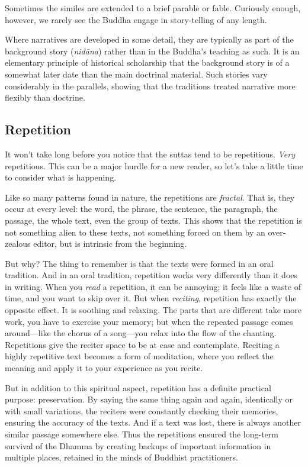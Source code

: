 \documentclass[12pt,openany]{book}%
\begin{document}
Sometimes the similes are extended to a brief parable or fable. Curiously enough, however, we rarely see the Buddha engage in story-telling of any length.

Where narratives are developed in some detail, they are typically as part of the background story (\textit{\textsanskrit{nidāna}}) rather than in the Buddha’s teaching as such. It is an elementary principle of historical scholarship that the background story is of a somewhat later date than the main doctrinal material. Such stories vary considerably in the parallels, showing that the traditions treated narrative more flexibly than doctrine.

\subsection*{Repetition}

It won’t take long before you notice that the suttas tend to be repetitious. \emph{Very} repetitious. This can be a major hurdle for a new reader, so let’s take a little time to consider what is happening.

Like so many patterns found in nature, the repetitions are \emph{fractal}. That is, they occur at every level: the word, the phrase, the sentence, the paragraph, the passage, the whole text, even the group of texts. This shows that the repetition is not something alien to these texts, not something forced on them by an over-zealous editor, but is intrinsic from the beginning.

But why? The thing to remember is that the texts were formed in an oral tradition. And in an oral tradition, repetition works very differently than it does in writing. When you \emph{read} a repetition, it can be annoying; it feels like a waste of time, and you want to skip over it. But when \emph{reciting}, repetition has exactly the opposite effect. It is soothing and relaxing. The parts that are different take more work, you have to exercise your memory; but when the repeated passage comes around—like the chorus of a song—you relax into the flow of the chanting. Repetitions give the reciter space to be at ease and contemplate. Reciting a highly repetitive text becomes a form of meditation, where you reflect the meaning and apply it to your experience as you recite.

But in addition to this spiritual aspect, repetition has a definite practical purpose: preservation. By saying the same thing again and again, identically or with small variations, the reciters were constantly checking their memories, ensuring the accuracy of the texts. And if a text was lost, there is always another similar passage somewhere else. Thus the repetitions ensured the long-term survival of the Dhamma by creating backups of important information in multiple places, retained in the minds of Buddhist practitioners.
\end{document}
